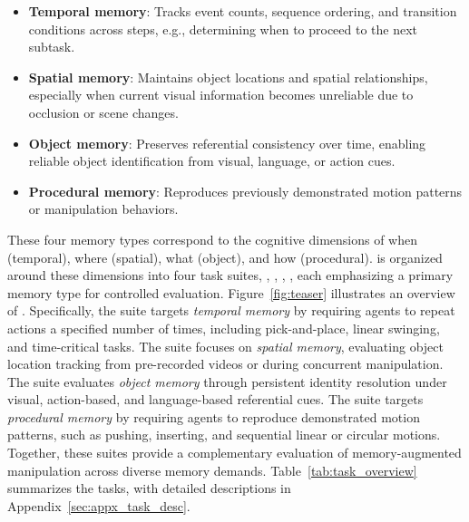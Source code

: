 \begin{itemize}[itemsep=1pt, topsep=0pt, leftmargin=*]
\item \textbf{Temporal memory}: Tracks event counts, sequence ordering, and transition conditions across steps, e.g., determining when to proceed to the next subtask. 

\item \textbf{Spatial memory}: Maintains object locations and spatial relationships, especially when current visual information becomes unreliable due to occlusion or scene changes.

\item \textbf{Object memory}: Preserves referential consistency over time, enabling reliable object identification from visual, language, or action cues.


\item \textbf{Procedural memory}: Reproduces previously demonstrated motion patterns or manipulation behaviors.

\end{itemize}

These four memory types correspond to the cognitive dimensions of when (temporal), where (spatial), what (object), and how (procedural).
\benchname\xspace is organized around these dimensions into four task suites, \TSone, \TStwo, \TSthree, \TSfour, each emphasizing a primary memory type for controlled evaluation.  Figure~\ref{fig:teaser} illustrates an overview of \benchname. Specifically, the \TSone\xspace suite targets \textit{temporal memory} by requiring agents to repeat actions a specified number of times, including pick-and-place, linear swinging, and time-critical  tasks. 
The \TStwo\xspace suite focuses on \textit{spatial memory}, evaluating object location tracking from pre-recorded videos or during concurrent manipulation.
The \TSthree\xspace suite evaluates \textit{object memory} through persistent identity resolution under visual, action-based, and language-based referential cues.
The \TSfour\xspace suite targets \textit{procedural memory} by requiring agents to reproduce demonstrated motion patterns, such as pushing, inserting, and sequential linear or circular motions.
Together, these suites provide a complementary evaluation of memory-augmented manipulation across diverse memory demands. 
Table~\ref{tab:task_overview} summarizes the tasks, with detailed descriptions in Appendix~\ref{sec:appx_task_desc}.


